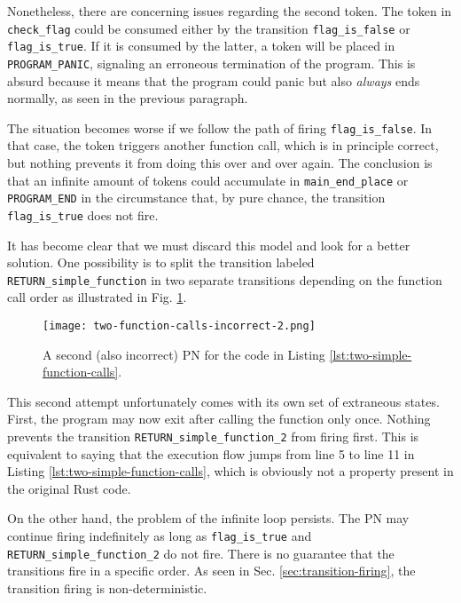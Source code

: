 \documentclass[../Thesis.tex]{subfiles}
\begin{document}
Nonetheless, there are concerning issues regarding the second token.
The token in \texttt{check\_flag} could be consumed either
by the transition \texttt{flag\_is\_false} or \texttt{flag\_is\_true}.
If it is consumed by the latter, a token will be placed in \texttt{PROGRAM\_PANIC},
signaling an erroneous termination of the program.
This is absurd because it means that the program could panic
but also \emph{always} ends normally, as seen in the previous paragraph.

The situation becomes worse if we follow the path of firing \texttt{flag\_is\_false}.
In that case, the token triggers another function call, which is in principle correct,
but nothing prevents it from doing this over and over again.
The conclusion is that an infinite amount of tokens could accumulate
in \texttt{main\_end\_place} or \texttt{PROGRAM\_END}
in the circumstance that, by pure chance,
the transition \texttt{flag\_is\_true} does not fire.

It has become clear that we must discard this model and look for a better solution.
One possibility is to split the transition labeled \texttt{RETURN\_simple\_function}
in two separate transitions depending on the function call order
as illustrated in Fig. \ref{fig:two-function-calls-incorrect-2}.

\begin{figure}[!htb]
    \centering
    \texttt{[image: two-function-calls-incorrect-2.png]}
    \caption{A second (also incorrect) \acrshort{PN} for the code
        in Listing \ref{lst:two-simple-function-calls}.}
    \label{fig:two-function-calls-incorrect-2}
\end{figure}

This second attempt unfortunately comes with its own set of extraneous states.
First, the program may now exit after calling the function only once.
Nothing prevents the transition \texttt{RETURN\_simple\_function\_2} from firing first.
This is equivalent to saying that the execution flow jumps
from line 5 to line 11 in Listing \ref{lst:two-simple-function-calls},
which is obviously not a property present in the original Rust code.

On the other hand, the problem of the infinite loop persists.
The \acrshort{PN} may continue firing indefinitely as long as
\texttt{flag\_is\_true} and \texttt{RETURN\_simple\_function\_2} do not fire.
There is no guarantee that the transitions fire in a specific order.
As seen in Sec. \ref{sec:transition-firing},
the transition firing is non-deterministic.
\end{document}
